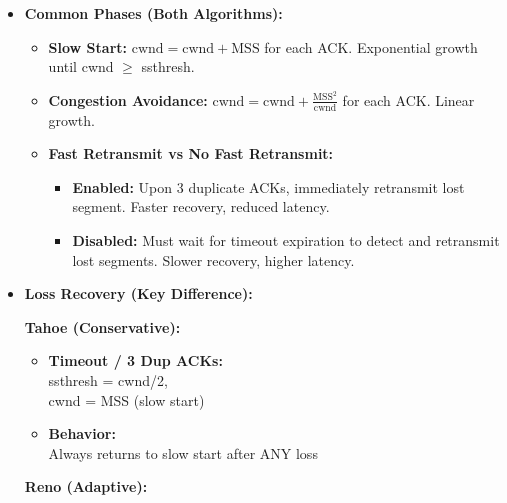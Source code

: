 \begin{minipage}[htp]{0.5\textwidth}
\begin{itemize}[noitemsep,nolistsep,topsep=0px,partopsep=0pt,parsep=0pt]
        \begin{itemize}[noitemsep,nolistsep,topsep=-5px,partopsep=0pt,parsep=0pt]
            \item \textbf{Common Phases (Both Algorithms):}
            \begin{itemize}[noitemsep,nolistsep,topsep=-5px,partopsep=0pt,parsep=0pt]
                \item \textbf{Slow Start:} $\boxed{\text{cwnd} = \text{cwnd} + \text{MSS}}$ for each ACK. Exponential growth until cwnd $\geq$ ssthresh.
                \item \textbf{Congestion Avoidance:} $\boxed{\text{cwnd} = \text{cwnd} + \frac{\text{MSS}^2}{\text{cwnd}}}$ for each ACK. Linear growth.
                \item \textbf{Fast Retransmit vs No Fast Retransmit:}
                \begin{itemize}[noitemsep,nolistsep,topsep=-5px,partopsep=0pt,parsep=0pt]
                    \item \textbf{Enabled:} Upon 3 duplicate ACKs, immediately retransmit lost segment. Faster recovery, reduced latency.
                    \item \textbf{Disabled:} Must wait for timeout expiration to detect and retransmit lost segments. Slower recovery, higher latency.
                \end{itemize}
            \end{itemize}
            \item \textbf{Loss Recovery (Key Difference):}\\
             \begin{minipage}[htp]{0.48\textwidth}
             \textbf{Tahoe (Conservative):}
             \begin{itemize}[noitemsep,nolistsep,topsep=-5px,partopsep=0pt,parsep=0pt]
                 \item \textbf{Timeout / 3 Dup ACKs:}\\   ssthresh = cwnd/2, \\cwnd = MSS (slow start)
                 \item \textbf{Behavior:}\\ Always returns to slow start after ANY loss
             \end{itemize}
             \end{minipage}
             \hfill
             \begin{minipage}[htp]{0.48\textwidth}
             \textbf{Reno (Adaptive):}
             \begin{itemize}[noitemsep,nolistsep,topsep=-5px,partopsep=0pt,parsep=0pt]

\end{itemize}
\end{minipage}
\end{itemize}
\end{itemize}
\end{minipage}

